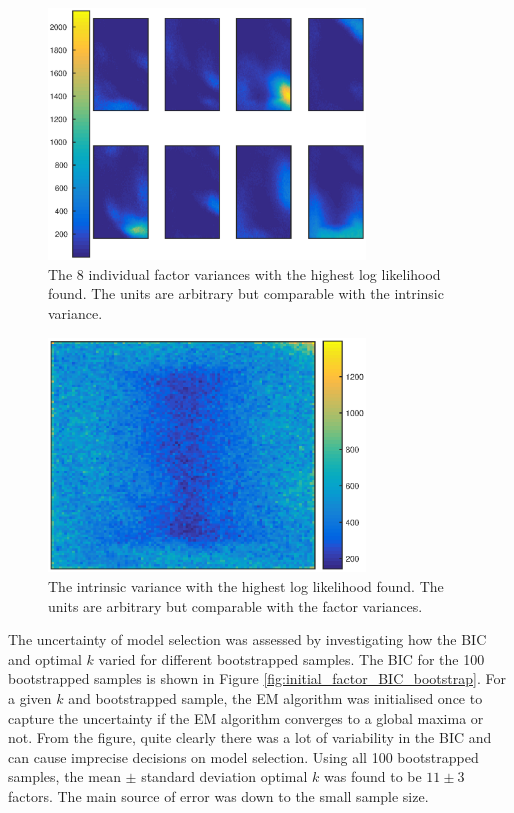 \documentclass[12pt]{report}
\begin{document}
\begin{figure}
	\centering
	\includegraphics[width=0.75\textwidth]{figures/initial_factor_factorNoise.eps}
	\caption{The 8 individual factor variances with the highest log likelihood found. The units are arbitrary but comparable with the intrinsic variance.}
	\label{fig:initial_factor_factorNoise}
\end{figure}

\begin{figure}
	\centering
	\includegraphics[width=0.75\textwidth]{figures/initial_factor_instrinicNoise.eps}
	\caption{The intrinsic variance with the highest log likelihood found. The units are arbitrary but comparable with the factor variances.}
	\label{fig:initial_factor_instrinicNoise}
\end{figure}

The uncertainty of model selection was assessed by investigating how the BIC and optimal $k$ varied for different bootstrapped samples. The BIC for the 100 bootstrapped samples is shown in Figure \ref{fig:initial_factor_BIC_bootstrap}. For a given $k$ and bootstrapped sample, the EM algorithm was initialised once to capture the uncertainty if the EM algorithm converges to a global maxima or not. From the figure, quite clearly there was a lot of variability in the BIC and can cause imprecise decisions on model selection. Using all 100 bootstrapped samples, the mean $\pm$ standard deviation optimal $k$ was found to be $11\pm3$ factors. The main source of error was down to the small sample size.
\end{document}
